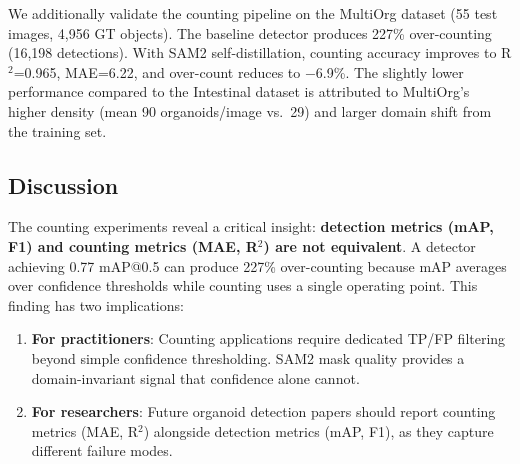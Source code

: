 We additionally validate the counting pipeline on the MultiOrg
dataset (55 test images, 4,956 GT objects). The baseline detector
produces 227\% over-counting (16,198 detections). With SAM2
self-distillation, counting accuracy improves to R$^2$=0.965,
MAE=6.22, and over-count reduces to $-$6.9\%. The slightly lower
performance compared to the Intestinal dataset is attributed to
MultiOrg's higher density (mean 90 organoids/image vs.\ 29) and
larger domain shift from the training set.

\subsection{Discussion}

The counting experiments reveal a critical insight: \textbf{detection
metrics (mAP, F1) and counting metrics (MAE, R$^2$) are not
equivalent}. A detector achieving 0.77 mAP@0.5 can produce 227\%
over-counting because mAP averages over confidence thresholds while
counting uses a single operating point. This finding has two
implications:

\begin{enumerate}
    \item \textbf{For practitioners}: Counting applications require
    dedicated TP/FP filtering beyond simple confidence thresholding.
    SAM2 mask quality provides a domain-invariant signal that
    confidence alone cannot.
    \item \textbf{For researchers}: Future organoid detection papers
    should report counting metrics (MAE, R$^2$) alongside detection
    metrics (mAP, F1), as they capture different failure modes.
\end{enumerate}






